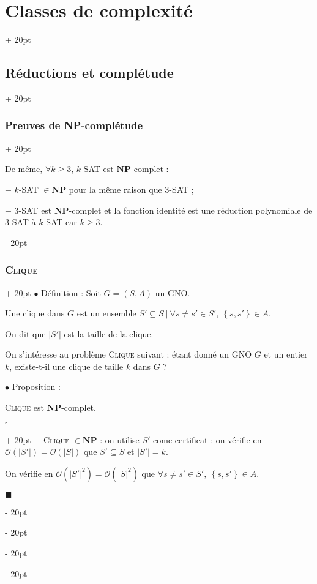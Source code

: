 \documentclass[a4paper, 12pt, twoside]{article}
\newcommand{\lr}[1]{\left( #1 \right)}
\newcommand{\set}[1]{\left\{ #1 \right\}}
\newcommand{\abs}[1]{\left\lvert #1 \right\rvert}
\renewcommand{\ge}{\geqslant}
\newcommand{\ind}[1][20pt]{\advance\leftskip + #1}
\newcommand{\deind}[1][20pt]{\advance\leftskip - #1}
\newenvironment{indt}[2][20pt]{#2 \par \ind[#1]}{\par \deind} %
\newenvironment{proof}[1][{}]{\begin{indt}{$\square$ #1}}{$\blacksquare$ \end{indt}}
\begin{document}
\begin{indt}{\section{Classes de complexité}}
\begin{indt}{\subsection{Réductions et complétude}}
\begin{indt}{\subsubsection{Preuves de \textbf{NP}-complétude}}
                \vspace{6pt}
                
                De même, $\forall k \ge 3$, $k$-SAT est $\mathbf{NP}$-complet :

                $-$ $k$-SAT $\in \mathbf{NP}$ pour la même raison que $3$-SAT ;

                $-$ $3$-SAT est \textbf{NP}-complet et la fonction identité est une réduction polynomiale de $3$-SAT à $k$-SAT car $k \ge 3$.
            \end{indt}

            \vspace{12pt}
            
            \begin{indt}{\subsubsection{\textsc{Clique}}}
                $\bullet$ Définition :
                Soit $G = (S, A)$ un GNO.

                Une clique dans $G$ est un ensemble $S' \subseteq S\ |\ \forall s \neq s' \in S',\ \set{s, s'} \in A$.

                On dit que $\abs{S'}$ est la taille de la clique.

                \vspace{6pt}
                
                On s'intéresse au problème \textsc{Clique} suivant : étant donné un GNO $G$ et un entier $k$, existe-t-il une clique de taille $k$ dans $G$ ?

                \vspace{12pt}
                
                $\bullet$ Proposition :
                \begin{emphBox}
                    \textsc{Clique} est \textbf{NP}-complet.
                \end{emphBox}

                \vspace{6pt}
                
                \begin{proof}
                    $-$ \textsc{Clique} $\in \mathbf{NP}$ : on utilise $S'$ come certificat : on vérifie en $\mathcal O(\abs{S'}) = \mathcal O(\abs S)$ que $S' \subseteq S$ et $\abs{S'} = k$.

                    On vérifie en $\mathcal O\!\lr{\abs{S'}^2} = \mathcal O\!\lr{\abs S ^2}$ que $\forall s \neq s' \in S',\ \set{s, s'} \in A$.


\end{proof}
\end{indt}
\end{indt}
\end{indt}
\end{document}
